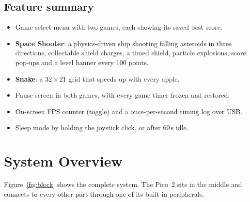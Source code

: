 \documentclass[11pt,a4paper]{article}
\newcommand{\unit}[2]{\ensuremath{#1\,\mathrm{#2}}}
\begin{document}
\subsection{Feature summary}
\begin{itemize}
  \item Game-select menu with two games, each showing its saved best score.
  \item \textbf{Space Shooter}: a physics-driven ship shooting falling asteroids
        in three directions, collectable shield charges, a timed shield, particle
        explosions, score pop-ups and a level banner every 100 points.
  \item \textbf{Snake}: a $32\times21$ grid that speeds up with every apple.
  \item Pause screen in both games, with every game timer frozen and restored.
  \item On-screen FPS counter (toggle) and a once-per-second timing log over USB.
  \item Sleep mode by holding the joystick click, or after \unit{60}{s} idle.
\end{itemize}

\section{System Overview}

Figure~\ref{fig:block} shows the complete system. The Pico~2 sits in the middle
and connects to every other part through one of its built-in peripherals.
\end{document}
